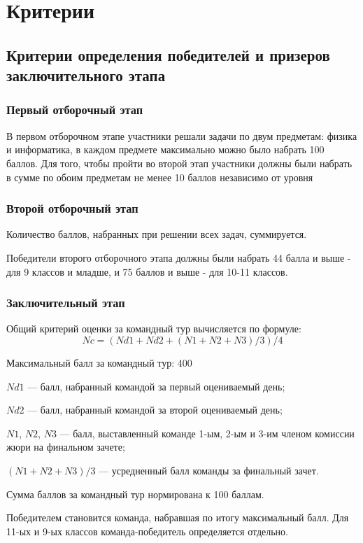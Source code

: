 \part{Критерии}

\chapter{Критерии определения победителей и призеров заключительного этапа}

\section{Первый отборочный этап}

В первом отборочном этапе участники решали задачи по двум предметам: физика и информатика, в каждом предмете максимально можно было набрать 100 баллов. Для того, чтобы пройти во второй этап участники  должны были набрать в сумме по обоим предметам не менее 10 баллов независимо от уровня

\section{Второй отборочный этап}

Количество баллов, набранных при решении всех задач, суммируется. 

Победители второго отборочного этапа должны были набрать 44 балла и выше - для 9 классов и младше, и 75 баллов и выше -  для 10-11 классов. 

\section{Заключительный этап}

Общий критерий оценки за командный тур вычисляется по формуле:
$$Nc = (Nd1 + Nd2 + (N1 + N2 + N3)/3)/4$$

Максимальный балл за командный тур: 400

$Nd1$ — балл, набранный командой за первый оцениваемый день;

$Nd2$ — балл, набранный командой за второй оцениваемый день;

$N1$, $N2$, $N3$ — балл, выставленный команде 1-ым, 2-ым и 3-им членом комиссии жюри на финальном зачете;

$(N1 + N2 + N3)/3$ — усредненный балл команды за финальный зачет.

Сумма баллов за командный тур нормирована к 100 баллам.

Победителем становится команда, набравшая по итогу максимальный балл. Для 11-ых и 9-ых классов команда-победитель определяется отдельно.

